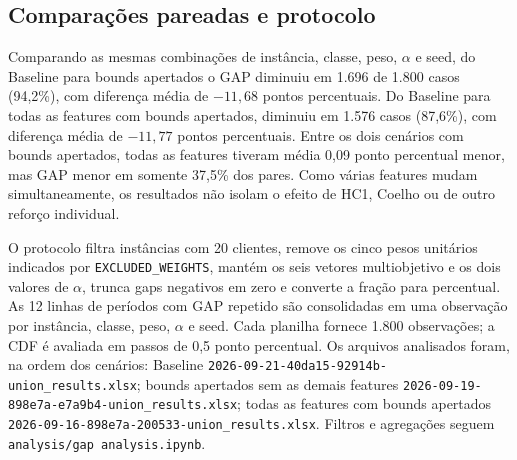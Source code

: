 \documentclass[11pt,a4paper]{article}
\begin{document}
\subsection{Comparações pareadas e protocolo}

Comparando as mesmas combinações de instância, classe, peso, $\alpha$ e seed,
do Baseline para bounds apertados o GAP diminuiu em 1.696 de 1.800 casos
(94,2\%), com diferença média de $-11,68$ pontos percentuais. Do Baseline
para todas as features com bounds apertados, diminuiu em 1.576 casos (87,6\%),
com diferença média de $-11,77$ pontos percentuais. Entre os dois cenários
com bounds apertados, todas as features tiveram média 0,09 ponto percentual
menor, mas GAP menor em somente 37,5\% dos pares. Como várias features mudam
simultaneamente, os resultados não isolam o efeito de HC1, Coelho ou de outro
reforço individual.

O protocolo filtra instâncias com 20 clientes, remove os cinco pesos unitários
indicados por \texttt{EXCLUDED\_WEIGHTS}, mantém os seis vetores multiobjetivo e
os dois valores de $\alpha$, trunca gaps negativos em zero e converte a fração
para percentual. As 12 linhas de períodos com GAP repetido são consolidadas em
uma observação por instância, classe, peso, $\alpha$ e seed. Cada planilha
fornece 1.800 observações; a CDF é avaliada em passos de 0,5 ponto percentual.
Os arquivos analisados foram, na ordem dos cenários: Baseline
\texttt{2026-09-21-40da15-92914b-union\_results.xlsx}; bounds apertados sem as
demais features \texttt{2026-09-19-898e7a-e7a9b4-union\_results.xlsx}; todas as
features com bounds apertados \texttt{2026-09-16-898e7a-200533-union\_results.xlsx}.
Filtros e agregações seguem \texttt{analysis/gap analysis.ipynb}.
\end{document}
